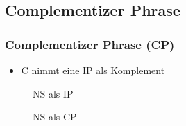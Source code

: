 \subsection{Complementizer Phrase}

\begin{frame}
\frametitle{Complementizer Phrase (CP)}

\begin{itemize}
	\item C nimmt eine IP als Komplement
\end{itemize}

\begin{figure}[b]
	\begin{minipage}[b]{0.45\textwidth}
	\centering
		\caption{NS als IP}	
  	\end{minipage}  
	\begin{minipage}[b]{0.45\textwidth}
	\centering
		\caption{NS als CP}	
  	\end{minipage}  
\end{figure}

\end{frame}



